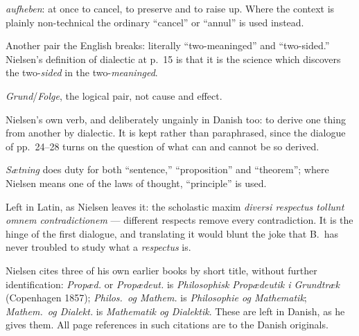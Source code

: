 \documentclass[12pt,a4paper]{book}
\begin{document}
\begin{description}[leftmargin=2.2em,style=nextline,itemsep=2pt]
\item[\emph{Ophæve, Ophævelse} --- ``sublate, sublation''] \textit{aufheben}:
at once to cancel, to preserve and to raise up. Where the context is plainly
non-technical the ordinary ``cancel'' or ``annul'' is used instead.

\item[\emph{Tvetydig} / \emph{Tvesidig} --- ``ambiguous'' / ``two-sided'']
Another pair the English breaks: literally ``two-meaninged'' and
``two-sided.'' Nielsen's definition of dialectic at p.~15 is that it is the
science which discovers the two-\emph{sided} in the two-\emph{meaninged}.

\item[\emph{Grund} / \emph{Følge} --- ``ground'' / ``consequent'']
\textit{Grund}/\textit{Folge}, the logical pair, not cause and effect.

\item[\emph{dialektisere} --- ``dialecticize''] Nielsen's own verb, and
deliberately ungainly in Danish too: to derive one thing from another by
dialectic. It is kept rather than paraphrased, since the dialogue of pp.~24--28
turns on the question of what can and cannot be so derived.

\item[\emph{Grundsætning} / \emph{Sætning} --- ``fundamental principle'' /
``proposition''] \emph{Sætning} does duty for both ``sentence,''
``proposition'' and ``theorem''; where Nielsen means one of the laws of
thought, ``principle'' is used.

\item[\emph{diversi respectus}] Left in Latin, as Nielsen leaves it: the
scholastic maxim \textit{diversi respectus tollunt omnem contradictionem} ---
different respects remove every contradiction. It is the hinge of the first
dialogue, and translating it would blunt the joke that B.\ has never troubled
to study what a \emph{respectus} is.

\end{description}

\noindent
Nielsen cites three of his own earlier books by short title, without further
identification: \textit{Propæd.} or \textit{Propædeut.} is
\textit{Philosophisk Propædeutik i Grundtræk} (Copenhagen 1857);
\textit{Philos.\ og Mathem.} is \textit{Philosophie og Mathematik};
\textit{Mathem.\ og Dialekt.} is \textit{Mathematik og Dialektik}. These are
left in Danish, as he gives them. All page references in such citations are to
the Danish originals.
\end{document}
